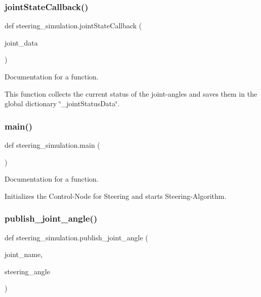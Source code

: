 \subsubsection{\texorpdfstring{jointStateCallback()}{jointStateCallback()}}
{\footnotesize\ttfamily def steering\+\_\+simulation.\+joint\+State\+Callback (\begin{DoxyParamCaption}\item[{}]{joint\+\_\+data }\end{DoxyParamCaption})}



Documentation for a function. 

This function collects the current status of the joint-\/angles and saves them in the global dictionary \char`\"{}\+\_\+joint\+Status\+Data\char`\"{}. \mbox{\label{namespacesteering__simulation_af3dec39cd8650ad512084dfda32c577a}} 
\subsubsection{\texorpdfstring{main()}{main()}}
{\footnotesize\ttfamily def steering\+\_\+simulation.\+main (\begin{DoxyParamCaption}{ }\end{DoxyParamCaption})}



Documentation for a function. 

Initializes the Control-\/\+Node for Steering and starts Steering-\/\+Algorithm. \mbox{\label{namespacesteering__simulation_aa303bfd6d5e874d19fda9e678aa4c3d9}} 
\subsubsection{\texorpdfstring{publish\_joint\_angle()}{publish\_joint\_angle()}}
{\footnotesize\ttfamily def steering\+\_\+simulation.\+publish\+\_\+joint\+\_\+angle (\begin{DoxyParamCaption}\item[{}]{joint\+\_\+name,  }\item[{}]{steering\+\_\+angle }\end{DoxyParamCaption})}



